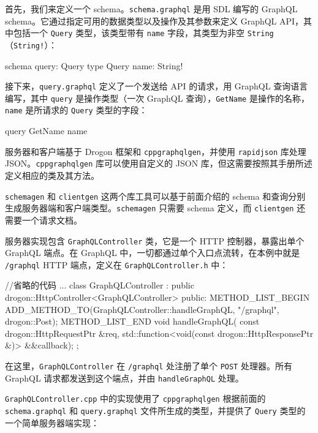 首先，我们来定义一个 schema。\texttt{schema.\allowbreak{}graphql} 是用 SDL 编写的 GraphQL schema。它通过指定可用的数据类型以及操作及其参数来定义 GraphQL API，其中包括一个 \texttt{Query} 类型，该类型带有 \texttt{name} 字段，其类型为非空 \texttt{String}（\texttt{String!}）：

\begin{codebox}[text]
schema {
  query: Query
}
type Query {
  name: String!
}
\end{codebox}

接下来，\texttt{query.\allowbreak{}graphql} 定义了一个发送给 API 的请求，用 GraphQL 查询语言编写，其中 \texttt{query} 是操作类型（一次 GraphQL 查询），\texttt{GetName} 是操作的名称，\texttt{name} 是所请求的 \texttt{Query} 类型的字段：

\begin{codebox}[text]
query GetName {
  name
}
\end{codebox}

服务器和客户端基于 Drogon 框架和 \texttt{cppgraphqlgen}，并使用 \texttt{rapidjson} 库处理 JSON。\texttt{cppgraphqlgen} 库可以使用自定义的 JSON 库，但这需要按照其手册所述定义相应的类及其方法。

\texttt{schemagen} 和 \texttt{clientgen} 这两个库工具可以基于前面介绍的 schema 和查询分别生成服务器端和客户端类型。\texttt{schemagen} 只需要 schema 定义，而 \texttt{clientgen} 还需要一个请求文档。

服务器实现包含 \texttt{Graph\allowbreak{}QLController} 类，它是一个 HTTP 控制器，暴露出单个 GraphQL 端点。在 GraphQL 中，一切都通过单个入口点流转，在本例中就是 \texttt{/graphql} HTTP 端点，定义在 \texttt{Graph\allowbreak{}QLController.\allowbreak{}h} 中：

\begin{codebox}[cpp]
//省略的代码
...
class GraphQLController : public drogon::HttpController<GraphQLController> {
public:
  METHOD_LIST_BEGIN
  ADD_METHOD_TO(GraphQLController::handleGraphQL, "/graphql", 
                drogon::Post);
  METHOD_LIST_END
  void handleGraphQL(
      const drogon::HttpRequestPtr &req,
      std::function<void(const drogon::HttpResponsePtr &)> &&callback);
};
\end{codebox}

\label{idx:1652}
在这里，\texttt{Graph\allowbreak{}QLController} 在 \texttt{/graphql} 处注册了单个 \texttt{POST} 处理器。所有 GraphQL 请求都发送到这个端点，并由 \texttt{handle\allowbreak{}Graph\allowbreak{}QL} 处理。

\label{idx:1653}
\texttt{Graph\allowbreak{}QLController.\allowbreak{}cpp} 中的实现使用了 \texttt{cppgraphqlgen} 根据前面的 \texttt{schema.\allowbreak{}graphql} 和 \texttt{query.\allowbreak{}graphql} 文件所生成的类型，并提供了 \texttt{Query} 类型的一个简单服务器端实现：

